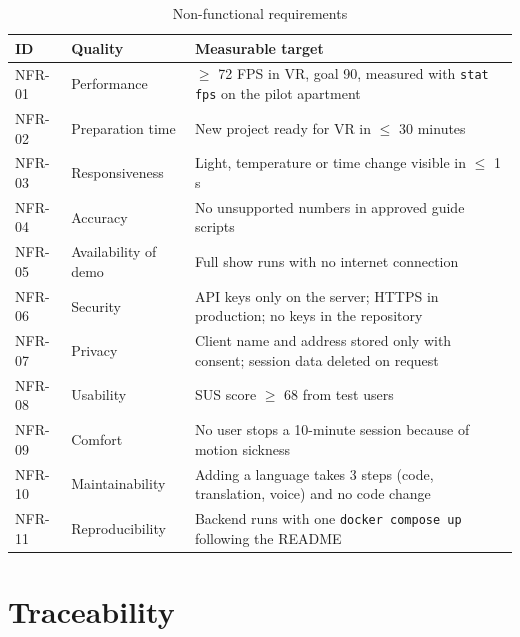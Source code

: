 \begin{table}[H]
\centering
\begin{tightblock}
\begin{tabularx}{\textwidth}{P{1.4cm} P{3.0cm} L}
\toprule
\textbf{ID} & \textbf{Quality} & \textbf{Measurable target} \\
\midrule
NFR-01 & Performance & $\ge$ 72 FPS in VR, goal 90, measured with \texttt{stat fps} on the pilot apartment \\
NFR-02 & Preparation time & New project ready for VR in $\le$ 30 minutes \\
NFR-03 & Responsiveness & Light, temperature or time change visible in $\le$ 1 s \\
NFR-04 & Accuracy & No unsupported numbers in approved guide scripts \\
NFR-05 & Availability of demo & Full show runs with no internet connection \\
NFR-06 & Security & API keys only on the server; HTTPS in production; no keys in the repository \\
NFR-07 & Privacy & Client name and address stored only with consent; session data deleted on request \\
NFR-08 & Usability & SUS score $\ge$ 68 from test users \\
NFR-09 & Comfort & No user stops a 10-minute session because of motion sickness \\
NFR-10 & Maintainability & Adding a language takes 3 steps (code, translation, voice) and no code change \\
NFR-11 & Reproducibility & Backend runs with one \texttt{docker compose up} following the README \\
\bottomrule
\end{tabularx}
\end{tightblock}
\caption{Non-functional requirements}
\label{tab:nfr}
\end{table}

\section{Traceability}

